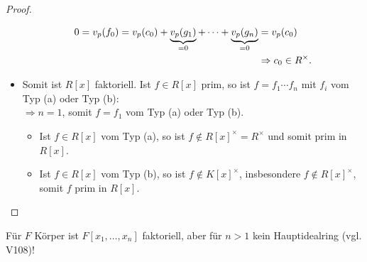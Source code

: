 \begin{proof}
\begin{itemize}
\begin{align}
	0 = v_p(f_0) = v_p(c_0) + \underbrace{v_p(g_1)}_{=0} +\cdots + \underbrace{v_p(g_n)}_{=0} &= v_p(c_0)\notag \\
	&\Rightarrow c_0 \in R^{\times}.\notag
	\end{align}
	\item Somit ist $R[x]$ faktoriell. Ist $f \in R[x]$ prim, so ist $f = f_1\cdots f_n$ mit $f_i$ vom Typ (a) oder Typ (b): \\
	$\Rightarrow n =1$, somit $f=f_1$ vom Typ (a) oder Typ (b).
	\begin{itemize}
		\item Ist $f \in R[x]$ vom Typ (a), so ist $f \not \in R[x]^{\times} = R^{\times}$ und somit prim in $R[x]$.
		\item Ist $f \in R[x]$ vom Typ (b), so ist $f \not \in K[x]^{\times}$, insbesondere $f \not \in R[x]^{\times}$, somit $f$ prim in $R[x]$.
	\end{itemize}
	\end{itemize}
\end{proof}

\begin{example}
	Für $F$ Körper ist $F[x_1,\dots,x_n]$ faktoriell, aber für $n > 1$ kein Hauptidealring (vgl. V108)!
\end{example}